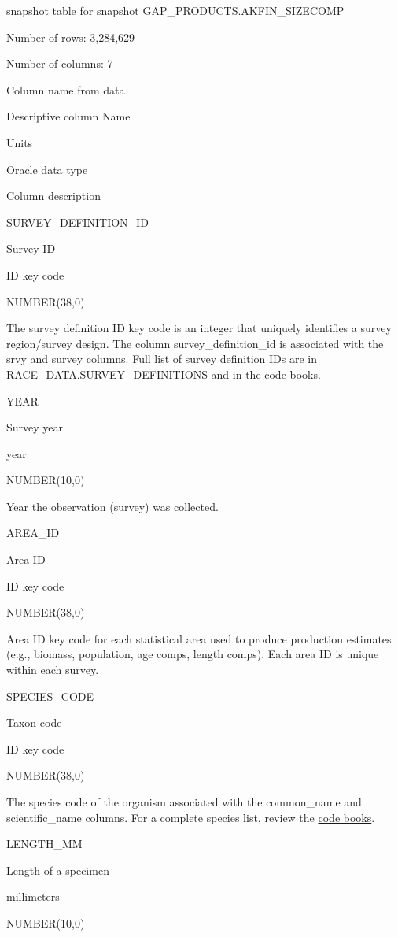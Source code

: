 \documentclass[
  letterpaper,
  oneside,
  open=any]{scrbook}
\begin{document}
snapshot table for snapshot GAP\_PRODUCTS.AKFIN\_SIZECOMP

Number of rows: 3,284,629

Number of columns: 7

Column name from data

Descriptive column Name

Units

Oracle data type

Column description

SURVEY\_DEFINITION\_ID

Survey ID

ID key code

NUMBER(38,0)

The survey definition ID key code is an integer that uniquely identifies
a survey region/survey design. The column survey\_definition\_id is
associated with the srvy and survey columns. Full list of survey
definition IDs are in RACE\_DATA.SURVEY\_DEFINITIONS and in the
\href{https://www.fisheries.noaa.gov/resource/document/groundfish-survey-species-code-manual-and-data-codes-manual}{code
books}.

YEAR

Survey year

year

NUMBER(10,0)

Year the observation (survey) was collected.

AREA\_ID

Area ID

ID key code

NUMBER(38,0)

Area ID key code for each statistical area used to produce production
estimates (e.g., biomass, population, age comps, length comps). Each
area ID is unique within each survey.

SPECIES\_CODE

Taxon code

ID key code

NUMBER(38,0)

The species code of the organism associated with the common\_name and
scientific\_name columns. For a complete species list, review the
\href{https://www.fisheries.noaa.gov/resource/document/groundfish-survey-species-code-manual-and-data-codes-manual}{code
books}.

LENGTH\_MM

Length of a specimen

millimeters

NUMBER(10,0)
\end{document}
